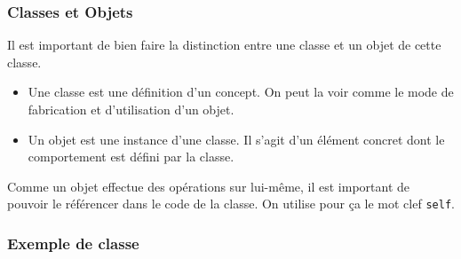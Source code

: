 \documentclass[handout]{beamer}
\begin{document}

\begin{frame}
\frametitle{Classes et Objets}
    Il est important de bien faire la distinction entre une classe et un objet de cette classe.
    \begin{itemize}
        \item Une classe est une définition d’un concept. On peut la voir comme le mode de fabrication et d'utilisation d'un objet. 
        \item Un objet est une instance d’une classe. Il s'agit d'un élément concret dont le comportement est défini par la
        classe.
    \end{itemize}
    
    Comme un objet effectue des opérations sur lui-même, il est important de pouvoir le référencer dans le code de la classe.
    On utilise pour ça le mot clef \texttt{self}.
\end{frame}

\begin{frame}
\frametitle{Exemple de classe}
    \classeEx
\end{frame}






\end{document}
